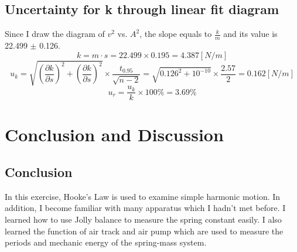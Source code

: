 \documentclass[12pt]{article}
\begin{document}
\subsection{Uncertainty for k through linear fit diagram}
Since I draw the diagram of $v^2$ vs. $A^2$, the slope equals to $\frac{k}{m}$ and its value is 22.499 $\pm$ 0.126.
$$k=m\cdot {s}=22.499\times0.195=4.387[N/m]$$ 
$$u_k=\sqrt{(\frac{\partial{k}}{\partial{s}})^2+(\frac{\partial{k}}{\partial{s}})^2}\times\frac{t_{0.95}}{\sqrt{n-2}}=\sqrt{0.126^2+10^{-10}}\times\frac{2.57}{2}=0.162[N/m]$$
$$u_r=\frac{u_k}{k}\times100\%=3.69\%$$
\section{Conclusion and Discussion}
\subsection{Conclusion}
In this exercise, Hooke's Law is used to examine simple harmonic motion. In addition, I become familiar with many apparatus which I hadn't met before. I learned how to use Jolly balance to measure the spring constant easily. I also learned the function of air track and air pump which are used to measure the periods and mechanic energy of the spring-mass system. 
\end{document}
